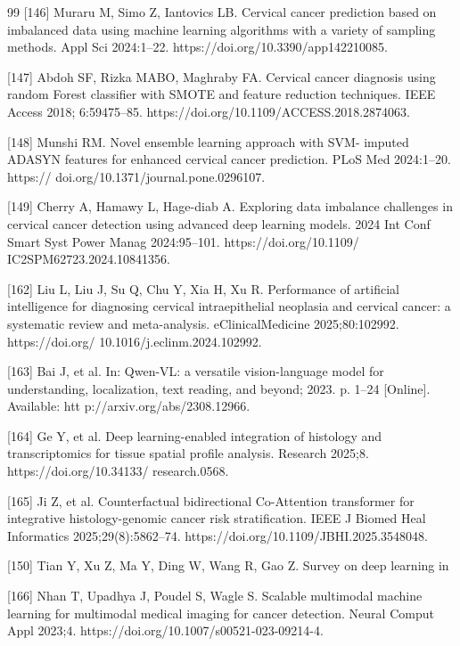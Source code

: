 \documentclass[final,5p,times,twocolumn,authoryear]{elsarticle}
\begin{document}
\begin{thebibliography}{99}
 [146] Muraru M, Simo Z, Iantovics LB. Cervical cancer prediction based on imbalanced data using machine learning algorithms with a variety of sampling methods. Appl Sci 2024:1–22. https://doi.org/10.3390/app142210085.

 [147] Abdoh SF, Rizka MABO, Maghraby FA. Cervical cancer diagnosis using random Forest classifier with SMOTE and feature reduction techniques. IEEE Access 2018; 6:59475–85. https://doi.org/10.1109/ACCESS.2018.2874063.

 [148] Munshi RM. Novel ensemble learning approach with SVM- imputed ADASYN features for enhanced cervical cancer prediction. PLoS Med 2024:1–20. https:// doi.org/10.1371/journal.pone.0296107.

 [149] Cherry A, Hamawy L, Hage-diab A. Exploring data imbalance challenges in cervical cancer detection using advanced deep learning models. 2024 Int Conf Smart Syst Power Manag 2024:95–101. https://doi.org/10.1109/ IC2SPM62723.2024.10841356.

 [162] Liu L, Liu J, Su Q, Chu Y, Xia H, Xu R. Performance of artificial intelligence for diagnosing cervical intraepithelial neoplasia and cervical cancer: a systematic review and meta-analysis. eClinicalMedicine 2025;80:102992. https://doi.org/ 10.1016/j.eclinm.2024.102992.

 [163] Bai J, et al. In: Qwen-VL: a versatile vision-language model for understanding, localization, text reading, and beyond; 2023. p. 1–24 [Online]. Available: htt p://arxiv.org/abs/2308.12966.

 [164] Ge Y, et al. Deep learning-enabled integration of histology and transcriptomics for tissue spatial profile analysis. Research 2025;8. https://doi.org/10.34133/ research.0568.

 [165] Ji Z, et al. Counterfactual bidirectional Co-Attention transformer for integrative histology-genomic cancer risk stratification. IEEE J Biomed Heal Informatics 2025;29(8):5862–74. https://doi.org/10.1109/JBHI.2025.3548048.

 [150] Tian Y, Xu Z, Ma Y, Ding W, Wang R, Gao Z. Survey on deep learning in

 [166] Nhan T, Upadhya J, Poudel S, Wagle S. Scalable multimodal machine learning for multimodal medical imaging for cancer detection. Neural Comput Appl 2023;4. https://doi.org/10.1007/s00521-023-09214-4.


\end{thebibliography}
\end{document}
